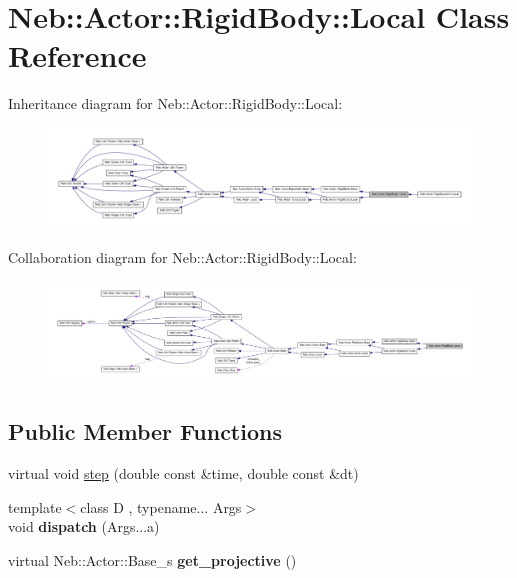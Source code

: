 \hypertarget{classNeb_1_1Actor_1_1RigidBody_1_1Local}{\section{\-Neb\-:\-:\-Actor\-:\-:\-Rigid\-Body\-:\-:\-Local \-Class \-Reference}
\label{classNeb_1_1Actor_1_1RigidBody_1_1Local}
}


\-Inheritance diagram for \-Neb\-:\-:\-Actor\-:\-:\-Rigid\-Body\-:\-:\-Local\-:\nopagebreak
\begin{figure}[H]
\begin{center}
\leavevmode
\includegraphics[width=350pt]{classNeb_1_1Actor_1_1RigidBody_1_1Local__inherit__graph}
\end{center}
\end{figure}


\-Collaboration diagram for \-Neb\-:\-:\-Actor\-:\-:\-Rigid\-Body\-:\-:\-Local\-:\nopagebreak
\begin{figure}[H]
\begin{center}
\leavevmode
\includegraphics[width=350pt]{classNeb_1_1Actor_1_1RigidBody_1_1Local__coll__graph}
\end{center}
\end{figure}
\subsection*{\-Public \-Member \-Functions}
\begin{DoxyCompactItemize}
\item 
virtual void \hyperlink{classNeb_1_1Actor_1_1RigidBody_1_1Local_ad0e1a796b0749eb0e3c075dfa93655af}{step} (double const \&time, double const \&dt)
\item 
\hypertarget{classNeb_1_1Actor_1_1RigidBody_1_1Local_a694d21c17cecc7e3320f5258bf004e54}{{\footnotesize template$<$class D , typename... \-Args$>$ }\\void {\bfseries dispatch} (\-Args...\-a)}\label{classNeb_1_1Actor_1_1RigidBody_1_1Local_a694d21c17cecc7e3320f5258bf004e54}

\item 
\hypertarget{classNeb_1_1Actor_1_1RigidBody_1_1Local_a0d2cf75bebde67df463be3f6e996dbbc}{virtual \-Neb\-::\-Actor\-::\-Base\-\_\-s {\bfseries get\-\_\-projective} ()}\label{classNeb_1_1Actor_1_1RigidBody_1_1Local_a0d2cf75bebde67df463be3f6e996dbbc}

\end{DoxyCompactItemize}


